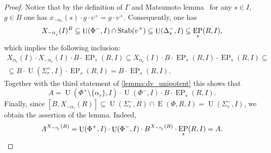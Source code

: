 \documentclass[11pt]{amsart}
\theoremstyle{plain}
\numberwithin{equation}{section}
\numberwithin{lemma}{section}
\theoremstyle{definition}
\theoremstyle{remark}
\DeclareMathOperator{\E}{E}
\DeclareMathOperator{\EP}{EP}
\DeclareMathOperator{\U}{U}
\DeclareMathOperator{\Stab}{Stab}
\def\ssub#1{\mathchoice
   {_{\lower2pt\hbox{$\scriptstyle #1$}}}
   {_{\lower2pt\hbox{$\scriptstyle #1$}}}
   {_{\lower1.5pt\hbox{$\scriptscriptstyle #1$}}}
   {_{\!\lower1.5pt\hbox{$\scriptscriptstyle #1$}}}}
\begin{document}
\begin{proof}
Notice that by the definition of $\Gamma$ and Matsumoto lemma~\cite[Lemma~2.3]{Ma69} for any $s\in I$, $ g\in B$ one has $x_{-\alpha_r}(s) \cdot g \cdot v^+ = g \cdot v^+$.
Consequently, one has
\[ X_{-\alpha\ssub{r}}(I)^{B} \subseteq \U(\Phi^-, I) \cap \Stab(v^+) \subseteq \U(\Delta_s^-, I) \subseteq \EP_s(R, I), \]
which implies the following inclusion:
\begin{multline*}
X_{\alpha_r}(I) \cdot X_{-\alpha_r}(I) \cdot B \cdot \EP_s(R, I) \subseteq 
X_{\alpha_r}(I) \cdot B \cdot \EP_s(R, I) \cdot \EP_s(R, I) \subseteq \\
\subseteq B \cdot \U(\Sigma_r^+, I) \cdot \EP_s(R, I) =
B \cdot \EP_s(R, I).
\end{multline*}
Together with the third statement of \cref{lemma:dv_unipotent} this shows that
\begin{equation*} \label{rel:sred}
A = \U(\Phi^+\setminus\{\alpha_r\}, I) \cdot \U(\Phi^-, I) \cdot B \cdot \EP_s(R, I).
\end{equation*}
Finally, since $[B, X_{-\alpha_r}(R)] \subseteq \U(\Sigma_r^-, R) \cap \E(\Phi, R, I) = \U(\Sigma_r^-, I)$, we obtain the assertion of the lemma. Indeed,
\begin{equation*} \label{rel:ninv} A^{X_{-\alpha\ssub{r}}(R)} = \U(\Phi^+, I) \cdot \U(\Phi^-, I) \cdot B ^{X_{-\alpha\ssub{r}}(R)} \cdot \EP_s(R, I) = A. \qedhere \end{equation*}
\end{proof}
\end{document}

